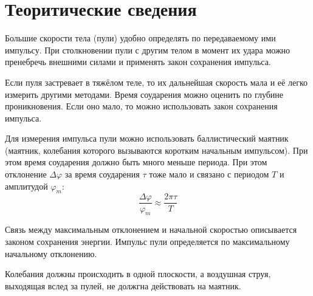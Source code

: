 \section{Теоритические сведения}

Большие скорости тела (пули) удобно определять по передаваемому ими импульсу.
При столкновении пули с другим телом в момент их удара можно пренебречь внешними
силами и применять закон сохранения импульса.

Если пуля застревает в тяжёлом теле, то их дальнейшая скорость мала и её легко
измерить другими методами. Время соударения можно оценить по глубине проникновения.
Если оно мало, то можно использовать закон сохранения импульса.

Для измерения импульса пули можно использовать баллистический маятник (маятник, колебания
которого вызываются коротким начальным импульсом). При этом время соударения должно быть
много меньше периода. При этом отклонение $\Delta\varphi$ за время соударения $\tau$ тоже
мало и связано с периодом $T$ и амплитудой $\varphi_m$:
\[\frac{\Delta\varphi}{\varphi_m}\approx\frac{2\pi\tau}{T}\]

Связь между максимальным отклонением и начальной скоростью описывается законом сохранения
энергии. Импульс пули определяется по максимальному начальному отклонению.

Колебания должны происходить в одной плоскости, а воздушная струя, выходящая вслед за
пулей, не должгна действовать на маятник.

\newpage

